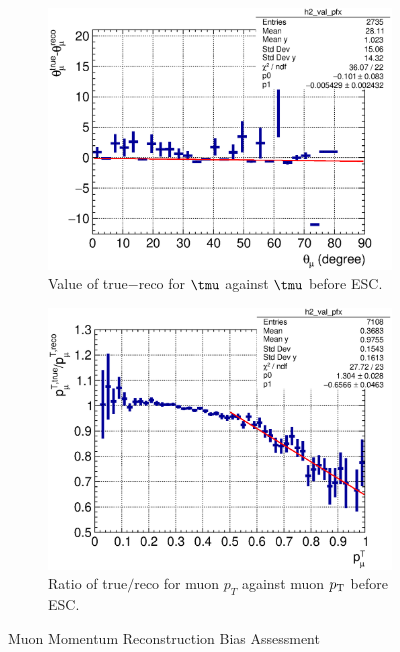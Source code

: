      \begin{figure}
     \centering
     \begin{subfigure}[b]{\dbfigwid\textwidth}
          \centering
          \includegraphics[width=\textwidth]{figures/sel/theta_mu_vs_theta_mu_res_hist2d_al14.eps}
          \caption{Value of true$-$reco for $\tmu$ against $\tmu$ before ESC.}
          \label{subfig:esc-mutheta}
     \end{subfigure}
     \begin{subfigure}[b]{\dbfigwid\textwidth}
          \centering
          \includegraphics[width=\textwidth]{figures/sel/mu_pt_vs_mu_pt_bias_hist2d_al13.eps}
          \caption{Ratio of true$/$reco for muon $p_T$ against muon $p_\textrm{T}$ before ESC.}
          \label{subfig:esc-mupt-bfesc}
     \end{subfigure}
     \caption{Muon Momentum Reconstruction Bias Assessment}
     \label{fig:esc-muptcor}
     \end{figure}

